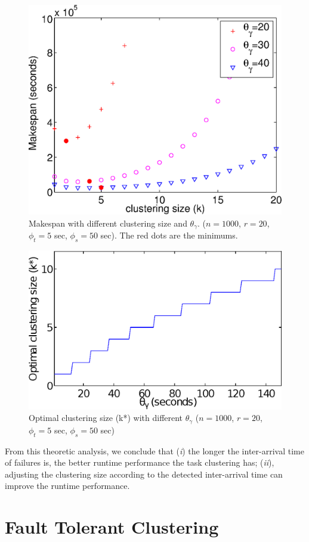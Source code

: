 \documentclass{IOS-Book-Article}
\begin{document}
\begin{figure}[!htb]
\centering
  \includegraphics[width=0.75\linewidth]{model_makespan2.eps}
  \caption{Makespan with different clustering size and $\theta_{\gamma}$. ($n=1000$, $r=20$, $\phi_t=5$ sec, $\phi_s=50$ sec). The red dots are the minimums. }
  \label{fig:model_makespan}
\end{figure}

\begin{figure}[!htb]
\centering
  \includegraphics[width=0.75\linewidth]{model_size2.eps}
  \caption{Optimal clustering size (k*) with different  $\theta_{\gamma}$ ($n=1000$, $r=20$, $\phi_t=5$ sec, $\phi_s=50$ sec)}
  \label{fig:model_size}
\end{figure}


From this theoretic analysis, we conclude that (\emph{i}) the longer the inter-arrival time of failures is, the better runtime performance the task clustering has; (\emph{ii}), adjusting the clustering size according to the detected inter-arrival time can improve the runtime performance. 

\section{Fault Tolerant Clustering}
\label{sec:clustering}
\end{document}
